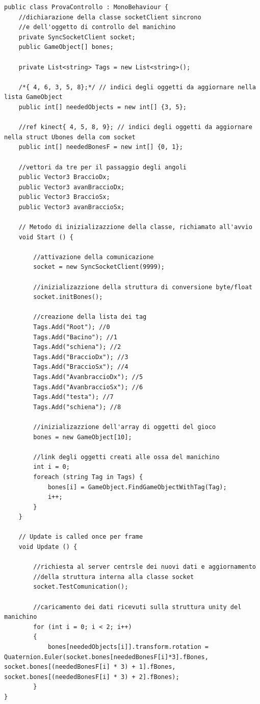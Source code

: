 \documentclass[10pt,a4paper]{article}
\begin{document}
\begin{lstlisting}[style=mycsharp, caption=class client C\#, captionpos=b]
public class ProvaControllo : MonoBehaviour {
	//dichiarazione della classe socketClient sincrono
	//e dell'oggetto di controllo del manichino
    private SyncSocketClient socket;
    public GameObject[] bones;
    
    private List<string> Tags = new List<string>();
    
    /*{ 4, 6, 3, 5, 8};*/ // indici degli oggetti da aggiornare nella lista GameObject  
    public int[] neededObjects = new int[] {3, 5}; 
    
    //ref kinect{ 4, 5, 8, 9}; // indici degli oggetti da aggiornare nella struct Ubones della com socket
    public int[] neededBonesF = new int[] {0, 1}; 
	
	//vettori da tre per il passaggio degli angoli
    public Vector3 BraccioDx;
    public Vector3 avanBraccioDx;
    public Vector3 BraccioSx;
    public Vector3 avanBraccioSx;

    // Metodo di inizializazzione della classe, richiamato all'avvio
    void Start () {
    
    	//attivazione della comunicazione
        socket = new SyncSocketClient(9999);
        
        //inizializazzione della struttura di conversione byte/float
        socket.initBones();
		
		//creazione della lista dei tag
        Tags.Add("Root"); //0
        Tags.Add("Bacino"); //1
        Tags.Add("schiena"); //2
        Tags.Add("BraccioDx"); //3
        Tags.Add("BraccioSx"); //4
        Tags.Add("AvanbraccioDx"); //5
        Tags.Add("AvanbraccioSx"); //6
        Tags.Add("testa"); //7
        Tags.Add("schiena"); //8
        
		//inizializazzione dell'array di oggetti del gioco
        bones = new GameObject[10];
        
        //link degli oggetti creati alle ossa del manichino
        int i = 0;
        foreach (string Tag in Tags) {
            bones[i] = GameObject.FindGameObjectWithTag(Tag);
            i++;
        }
    }
    
	// Update is called once per frame
	void Update () {
		
		//richiesta al server centrsle dei nuovi dati e aggiornamento 
		//della struttura interna alla classe socket
        socket.TestComunication();
		
		//caricamento dei dati ricevuti sulla struttura unity del manichino
        for (int i = 0; i < 2; i++)
        {   
            bones[neededObjects[i]].transform.rotation = Quaternion.Euler(socket.bones[neededBonesF[i]*3].fBones, socket.bones[(neededBonesF[i] * 3) + 1].fBones, socket.bones[(neededBonesF[i] * 3) + 2].fBones);
        }
}

\end{lstlisting}
\end{document}
